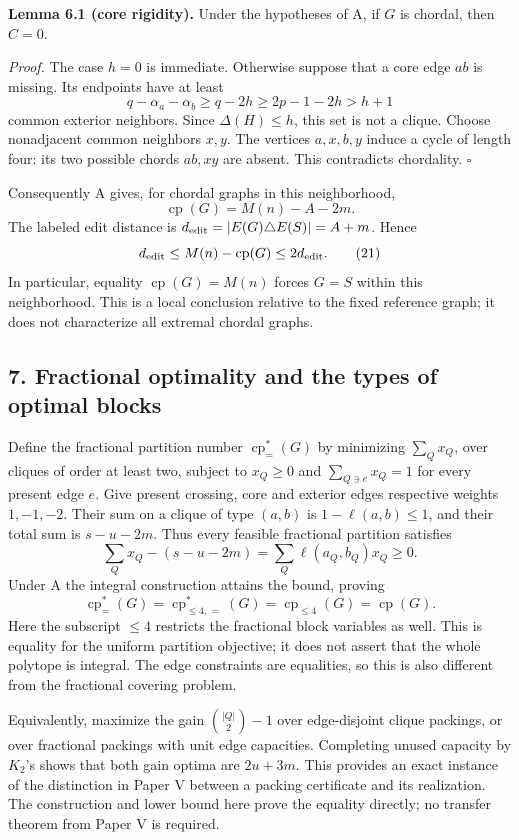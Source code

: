 \documentclass[english,11pt,a4paper]{article}
\begin{document}
\textbf{Lemma 6.1 (core rigidity).} Under the hypotheses of A, if \(G\)
is chordal, then \(C=0\).

\emph{Proof.} The case \(h=0\) is immediate. Otherwise suppose that a
core edge \(ab\) is missing. Its endpoints have at least \[
q-\alpha_a-\alpha_b\ge q-2h\ge2p-1-2h>h+1
\] common exterior neighbors. Since \(\Delta(H)\le h\), this set is not
a clique. Choose nonadjacent common neighbors \(x,y\). The vertices
\(a,x,b,y\) induce a cycle of length four: its two possible chords
\(ab,xy\) are absent. This contradicts chordality. \(\square\)

Consequently A gives, for chordal graphs in this neighborhood, \[
\operatorname{cp}(G)=M(n)-A-2m. \tag{20}
\] The labeled edit distance is
\(d_{\rm edit}=|E(G)\triangle E(S)|=A+m\). Hence \[
d_{\rm edit}\le M(n)-\operatorname{cp}(G)\le2d_{\rm edit}. \tag{21}
\] In particular, equality \(\operatorname{cp}(G)=M(n)\) forces \(G=S\)
within this neighborhood. This is a local conclusion relative to the
fixed reference graph; it does not characterize all extremal chordal
graphs.

\subsection{7. Fractional optimality and the types of optimal
blocks}\label{fractional-optimality-and-the-types-of-optimal-blocks}

Define the fractional partition number \(\operatorname{cp}_{=}^{*}(G)\)
by minimizing \(\sum_Q x_Q\), over cliques of order at least two,
subject to \(x_Q\ge0\) and \(\sum_{Q\ni e}x_Q=1\) for every present edge
\(e\). Give present crossing, core and exterior edges respective weights
\(1,-1,-2\). Their sum on a clique of type \((a,b)\) is
\(1-\ell(a,b)\le1\), and their total sum is \(s-u-2m\). Thus every
feasible fractional partition satisfies \[
\sum_Qx_Q-(s-u-2m)=\sum_Q\ell(a_Q,b_Q)x_Q\ge0.
\] Under A the integral construction attains the bound, proving \[
\operatorname{cp}_{=}^{*}(G)=\operatorname{cp}_{\le4,=}^{*}(G)
=\operatorname{cp}_{\le4}(G)=\operatorname{cp}(G). \tag{22}
\] Here the subscript \(\le4\) restricts the fractional block variables
as well. This is equality for the uniform partition objective; it does
not assert that the whole polytope is integral. The edge constraints are
equalities, so this is also different from the fractional covering
problem.

Equivalently, maximize the gain \(\binom{|Q|}{2}-1\) over edge-disjoint
clique packings, or over fractional packings with unit edge capacities.
Completing unused capacity by \(K_2\)'s shows that both gain optima are
\(2u+3m\). This provides an exact instance of the distinction in Paper V
between a packing certificate and its realization. The construction and
lower bound here prove the equality directly; no transfer theorem from
Paper V is required.
\end{document}
